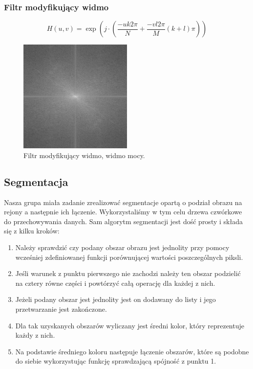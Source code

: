 \documentclass{classrep}
\begin{document}
\subsubsection{Filtr modyfikujący widmo}

\begin{equation}
\label{eq:modyfikacja}
H(u,v) = \exp { \left( j \cdot \left( \frac{-u k 2 \pi}{N} + \frac{-v l 2 \pi }{M} \left( k + l  \right) \pi \right)\right) }
\end{equation}

\begin{figure}[H]
  \centering
  \includegraphics[width=0.5\textwidth]{img/lena_spectreMod}
  \caption{Filtr modyfikujący widmo, widmo mocy.}
  \label{fig_widmo_lena_spectreMod}
\end{figure}


\subsection{Segmentacja}
Nasza grupa miała zadanie zrealizować segmentacje opartą o podział obrazu na rejony a następnie ich łączenie. Wykorzystaliśmy w tym celu drzewa czwórkowe do przechowywania danych. Sam algorytm segmentacji jest dość prosty i składa się z kilku kroków:
\begin{enumerate}
\item Należy sprawdzić czy podany obszar obrazu jest jednolity przy pomocy wcześniej zdefiniowanej funkcji porównującej wartości poszczególnych piksli.
\item Jeśli warunek z punktu pierwszego nie zachodzi należy ten obszar podzielić na cztery równe części i powtórzyć całą operację dla każdej z nich.
\item Jeżeli podany obszar jest jednolity jest on dodawany do listy i jego przetwarzanie jest zakończone.
\item Dla tak uzyskanych obszarów wyliczany jest średni kolor, który reprezentuje każdy z nich.
\item Na podstawie średniego koloru następuje łączenie obszarów, które są podobne do siebie wykorzystując funkcję sprawdzającą spójność z punktu 1.
\end{enumerate}
\end{document}
